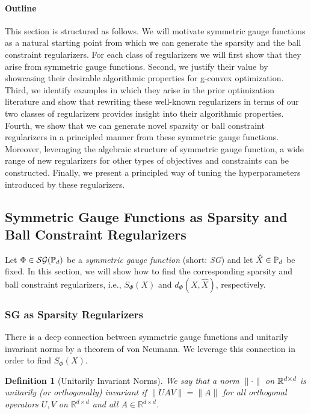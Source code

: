 \documentclass[sn-nature]{sn-jnl}%
\theoremstyle{thmstyleone}%
\newtheorem{defn}{Definition}
\theoremstyle{thmstyletwo}%
\theoremstyle{thmstylethree}%
\begin{document}
\paragraph{Outline} This section is structured as follows. We will motivate symmetric gauge functions as a natural starting point from which we can generate the sparsity and the ball constraint regularizers. For each class of regularizers we will first show that they arise from symmetric gauge functions. Second, we justify their value by showcasing their desirable algorithmic properties for g-convex optimization. Third,  we identify examples in which they arise in the prior optimization literature and show that rewriting these well-known regularizers in terms of our two classes of regularizers provides insight into their algorithmic properties. Fourth, we show that we can generate novel sparsity or ball constraint regularizers in a principled manner from these symmetric gauge functions. Moreover, leveraging the algebraic structure of symmetric gauge function, a wide range of new regularizers for other types of objectives and constraints can be constructed. Finally, we present a principled way of tuning the hyperparameters introduced by these regularizers. 

\subsection{Symmetric Gauge Functions as Sparsity and Ball Constraint Regularizers}
Let $\Phi \in \mathcal{SG}(\mathbb{P}_d)$ be a \emph{symmetric gauge function} (short: \emph{SG}) and let $\hat{X} \in \mathbb{P}_d$ be fixed. In this section, we will show how to find the corresponding sparsity and ball constraint regularizers, i.e.,  $S_\Phi(X)$ and $d_\Phi(X, \hat{X})$, respectively.

\subsubsection{SG as Sparsity Regularizers}  

There is a deep connection between symmetric gauge functions and unitarily invariant norms by a theorem of von Neumann. We leverage this connection in order to find $S_\Phi(X)$. 


    \begin{defn}[Unitarily Invariant Norms]
    We say that a norm $\| \cdot \|$ on $\mathbb{R}^{d \times d}$ is  unitarily (or orthogonally) invariant if $\|UAV\| = \|A\|$ for all orthogonal operators $U,V$ on $\mathbb{R}^{d \times d}$ and all $A \in \mathbb{R}^{d \times d}$. 
    \end{defn}
\end{document}
